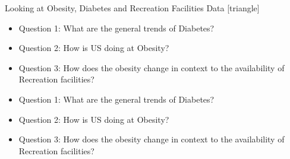 \documentclass{beamer} %
\begin{document}
\begin{frame}{Looking at Obesity, Diabetes and Recreation Facilities Data}
  [triangle]

    \begin{itemize}
      \item Question 1: What are the general trends of Diabetes?
      \item Question 2: How is US doing at Obesity?
      \item Question 3: How does the obesity change in context to the availability of Recreation facilities?
    \end{itemize}

   \begin{itemize}
     \item Question 1: What are the general trends of Diabetes?
     \item Question 2: How is US doing at Obesity?
     \item Question 3: How does the obesity change in context to the availability of Recreation facilities?
   \end{itemize}

\end{frame}
\end{document}
